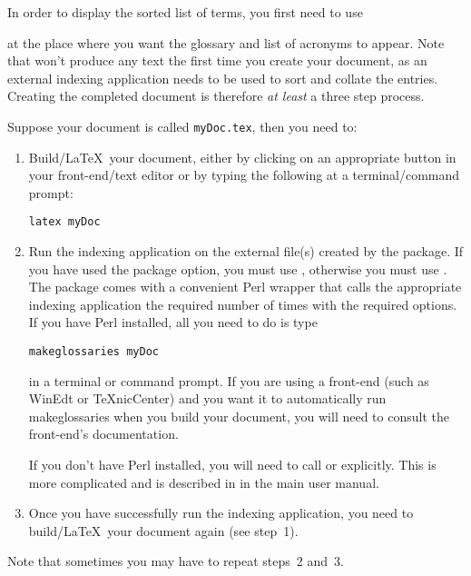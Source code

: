 \documentclass{nlctdoc}
\begin{document}
In order to display the sorted list of terms, you first need to
use
\begin{definition}
\end{definition}
at the place where you want the glossary and list of acronyms to
appear.  Note that  won't produce any text the
first time you create your document, as an external indexing
application needs to be used to sort and collate the entries.
Creating the completed document is therefore \emph{at least} a three
step process.

Suppose your document is called \texttt{myDoc.tex}, then you need
to:
\begin{enumerate}
\item Build/\LaTeX\ your document, either by clicking on an
appropriate button in your front-end/text editor or by typing the
following at a terminal/command prompt:
\begin{verbatim}
latex myDoc
\end{verbatim}

\item Run the indexing application on the external file(s) created
by the  package. If you have used the 
package option, you must use , otherwise you must use 
. The  package comes with a convenient
Perl wrapper that calls the appropriate indexing application the
required number of times with the required options. If you have Perl
installed, all you need to do is type
\begin{verbatim}
makeglossaries myDoc
\end{verbatim}
in a terminal or command prompt. If you are using a front-end (such
as WinEdt or TeXnicCenter) and you want it to automatically run
makeglossaries when you build your document, you will need to
consult the front-end's documentation.

If you don't have Perl installed, you will need to call
 or  explicitly. This is more complicated
and is described in
 in the main  user manual.

\item Once you have successfully run the indexing application, you
need to build/\LaTeX\ your document again (see step~1).
\end{enumerate}
Note that sometimes you may have to repeat steps~2 and~3.
\end{document}
